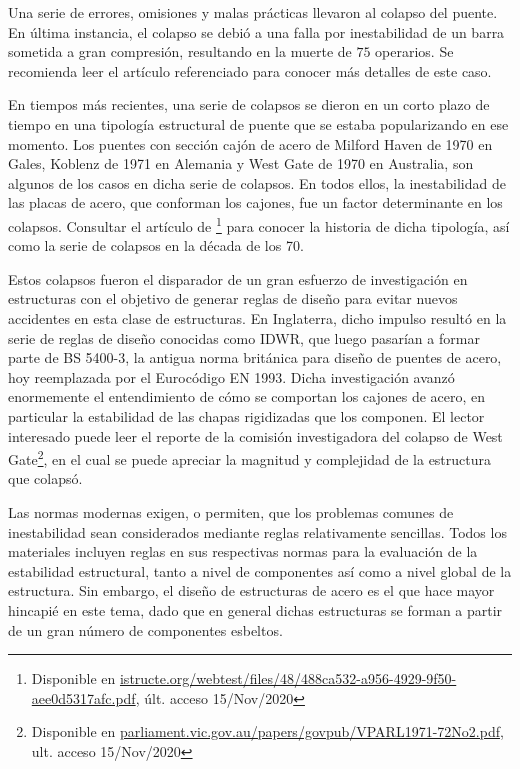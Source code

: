 Una serie de errores, omisiones y malas prácticas llevaron al colapso del puente. En última instancia, el colapso se debió a una falla por inestabilidad de un barra sometida a gran compresión, resultando en la muerte de $75$ operarios. Se recomienda leer el artículo referenciado para conocer más detalles de este caso.

En tiempos más recientes, una serie de colapsos se dieron en un corto plazo de tiempo en una tipología estructural de puente que se estaba popularizando en ese momento. %
%
Los puentes con sección cajón de acero de Milford Haven de 1970 en Gales, Koblenz de 1971 en Alemania y West Gate de 1970 en Australia, son algunos de los casos en dicha serie de colapsos. %
%
En todos ellos, la inestabilidad de las placas de acero, que conforman los cajones, fue un factor determinante en los colapsos. %
%
Consultar el artículo de \cite{Firth2010}\footnote{Disponible en \href{https://www.istructe.org/webtest/files/48/488ca532-a956-4929-9f50-aee0d5317afc.pdf}{istructe.org/webtest/files/48/488ca532-a956-4929-9f50-aee0d5317afc.pdf}, últ. acceso 15/Nov/2020} para conocer la historia de dicha tipología, así como la serie de colapsos en la década de los 70.

Estos colapsos fueron el disparador de un gran esfuerzo de investigación en estructuras con el objetivo de generar reglas de diseño para evitar nuevos accidentes en esta clase de estructuras. %
%
En Inglaterra, dicho impulso resultó en la serie de reglas de diseño conocidas como IDWR, que luego pasarían a formar parte de BS 5400-3, la antigua norma británica para diseño de puentes de acero, hoy reemplazada por el Eurocódigo EN 1993. %
%
Dicha investigación avanzó enormemente el entendimiento de cómo se comportan los cajones de acero, en particular la estabilidad de las chapas rigidizadas que los componen. El lector interesado puede leer el reporte de la comisión investigadora del colapso de West Gate\footnote{Disponible en \href{http://www.parliament.vic.gov.au/papers/govpub/VPARL1971-72No2.pdf}{parliament.vic.gov.au/papers/govpub/VPARL1971-72No2.pdf}, ult. acceso 15/Nov/2020}, en el cual se puede apreciar la magnitud y complejidad de la estructura que colapsó. 

Las normas modernas exigen, o permiten, que los problemas comunes de inestabilidad sean considerados mediante reglas relativamente sencillas. Todos los materiales incluyen reglas en sus respectivas normas para la evaluación de la estabilidad estructural, tanto a nivel de componentes así como a nivel global de la estructura. %
Sin embargo, el diseño de estructuras de acero es el que hace mayor hincapié en este tema, dado que en general dichas estructuras se forman a partir de un gran número de componentes esbeltos. 

